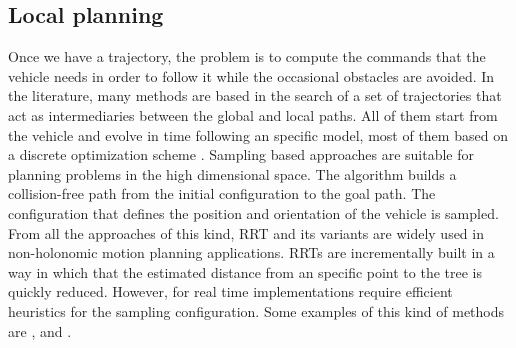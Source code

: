 \subsection{Local planning}\label{ch:chapter00_02_03}

Once we have a trajectory, the problem is to compute the commands that the vehicle needs in order to follow it while the occasional obstacles are avoided. In the literature, many methods are based in the search of a set of trajectories that act as intermediaries between the global and local paths. All of them start from the vehicle and evolve in time following an specific model, most of them based on a discrete optimization scheme \citep{thrun2006stanley, montemerlo2008junior, werling2010optimal, ferguson2008motion}.
Sampling based approaches are suitable for planning problems in the high dimensional space. The algorithm builds a collision-free path from the initial configuration to the goal path. The configuration that defines the position and orientation of the vehicle is sampled. From all the approaches of this kind, \ac{RRT} and its variants are widely used in non-holonomic motion planning applications.
\acp{RRT} are incrementally built in a way in which that the estimated distance from an specific point to the tree is quickly reduced. However, for real time implementations require efficient heuristics for the sampling configuration. 
Some examples of this kind of methods are \cite{van1997real}, \cite{lavalle2001randomized} and \cite{kuwata2009real}.

